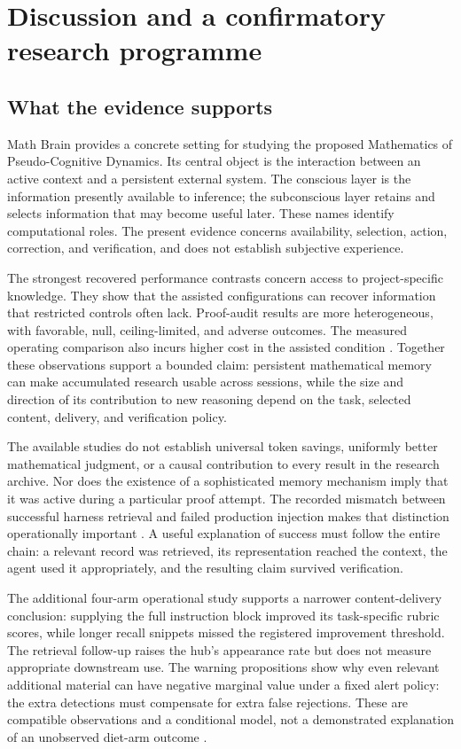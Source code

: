 \section{Discussion and a confirmatory research programme}
\label{sec:discussion}

\subsection{What the evidence supports}

Math Brain provides a concrete setting for studying the proposed Mathematics of Pseudo-Cognitive Dynamics. Its central object is the interaction between an active context and a persistent external system. The conscious layer is the information presently available to inference; the subconscious layer retains and selects information that may become useful later. These names identify computational roles. The present evidence concerns availability, selection, action, correction, and verification, and does not establish subjective experience.

The strongest recovered performance contrasts concern access to project-specific knowledge. They show that the assisted configurations can recover information that restricted controls often lack. Proof-audit results are more heterogeneous, with favorable, null, ceiling-limited, and adverse outcomes. The measured operating comparison also incurs higher cost in the assisted condition \citep{twoopus,benchmark_onek,benchmark_recall200,benchmark_t3,twoopususage}. Together these observations support a bounded claim: persistent mathematical memory can make accumulated research usable across sessions, while the size and direction of its contribution to new reasoning depend on the task, selected content, delivery, and verification policy.

The available studies do not establish universal token savings, uniformly better mathematical judgment, or a causal contribution to every result in the research archive. Nor does the existence of a sophisticated memory mechanism imply that it was active during a particular proof attempt. The recorded mismatch between successful harness retrieval and failed production injection makes that distinction operationally important \citep{mathsense}. A useful explanation of success must follow the entire chain: a relevant record was retrieved, its representation reached the context, the agent used it appropriately, and the resulting claim survived verification.

The additional four-arm operational study supports a narrower content-delivery conclusion: supplying the full instruction block improved its task-specific rubric scores, while longer recall snippets missed the registered improvement threshold. The retrieval follow-up raises the hub's appearance rate but does not measure appropriate downstream use. The warning propositions show why even relevant additional material can have negative marginal value under a fixed alert policy: the extra detections must compensate for extra false rejections. These are compatible observations and a conditional model, not a demonstrated explanation of an unobserved diet-arm outcome \citep{benchmark_update_t11_result,benchmark_update_t12_result}.

